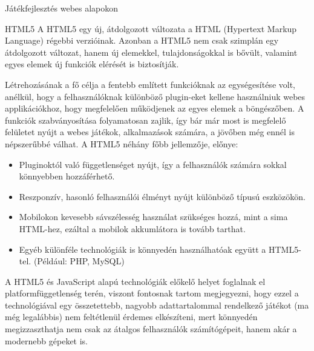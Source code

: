 \begin{MyChapter}{Játékfejlesztés webes alapokon}
	\begin{MySection}{HTML5}
		A HTML5 egy új, átdolgozott változata a HTML (Hypertext Markup Language) régebbi verzióinak.
		Azonban a HTML5 nem csak szimplán egy átdolgozott változat, hanem új elemekkel, tulajdonságokkal is bővült, valamint egyes elemek új funkciók elérését is biztosítják.
		
		Létrehozásának a fő célja a fentebb említett funkcióknak az egységesítése volt, anélkül, hogy a felhasználóknak különböző plugin-eket kellene használniuk webes applikációkhoz, hogy megfelelően működjenek az egyes elemek a böngészőben.
		A funkciók szabványosítása folyamatosan zajlik, így bár már most is megfelelő felületet nyújt a webes játékok, alkalmazások számára, a jövőben még ennél is népszerűbbé válhat.
		\newline \newline
		A HTML5 néhány főbb jellemzője, előnye:
		\begin{itemize}
			\item Pluginoktól való függetlenséget nyújt, így a felhasználók számára sokkal könnyebben hozzáférhető.
			\item Reszponzív, hasonló felhasználói élményt nyújt különböző típusú eszközökön.
			\item Mobilokon kevesebb sávszélesség használat szükséges hozzá, mint a sima HTML-hez, ezáltal a mobilok akkumlátora is tovább tarthat.
			\item Egyéb különféle technológiák is könnyedén használhatóak együtt a HTML5-tel. (Például: PHP, MySQL)
		\end{itemize}

		A HTML5 és JavaScript alapú technológiák előkelő helyet foglalnak el platformfüggetlenség terén, viszont fontosnak tartom megjegyezni, hogy ezzel a technológiával egy összetettebb, nagyobb adattartalommal rendelkező játékot (ma még legalábbis) nem feltétlenül érdemes elkészíteni, mert könnyedén megizzaszthatja nem csak az átalgos felhasználók számítógépeit, hanem akár a modernebb gépeket is.
		\cite{html5_future}
		\cite{html5}
	\end{MySection}


\end{MyChapter}
